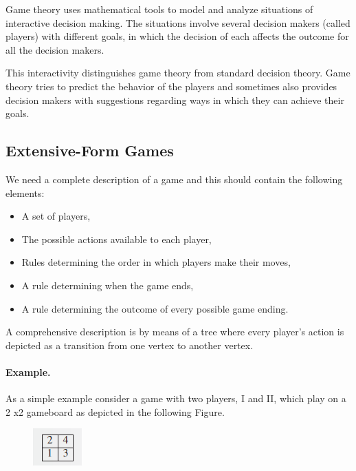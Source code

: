 
Game theory uses mathematical tools to model and analyze situations of interactive decision making. The situations involve several decision makers (called players) with different goals, in which the decision of each affects the outcome for all the decision makers.

This interactivity distinguishes game theory from standard decision theory. Game theory tries to predict the behavior of the players and sometimes also provides decision makers with suggestions regarding ways in which they can achieve their goals.

\subsection{Extensive-Form Games}

We need a complete description of a game and this should contain the following elements:

\begin{itemize}
\item A set of players,
\item The possible actions available to each player,
\item Rules determining the order in which players make their moves,
\item A rule determining when the game ends,
\item A rule determining the outcome of every possible game ending.
\end{itemize}

A comprehensive description is by means of a tree where every player’s action is depicted as a transition from one vertex to another vertex.

\paragraph{Example.} As a simple example consider a game with two players, I and II, which play on a 2 x2 gameboard as depicted in the following Figure.

\begin{figure}[H]
    \centering
    \includegraphics[scale=1.2]{images/2023-10-10-game_theory_01.png}
\end{figure}


